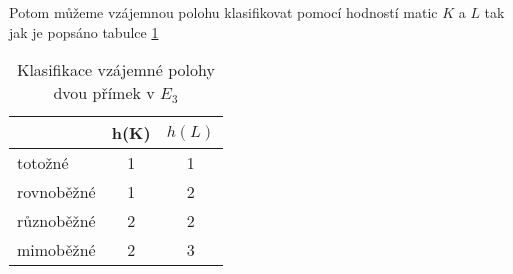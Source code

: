 Potom můžeme vzájemnou polohu klasifikovat pomocí hodností matic $K$ a $L$ tak jak je popsáno
tabulce \ref{tab:roviny_poloha}
\begin{table}[h]
    \centering
    \begin{tabular}{|l|c|c|}
    \hline
     & \multicolumn{1}{l|}{h(K)} & \multicolumn{1}{l|}{$h(L)$} \\ \hline
    totožné & 1 & 1 \\ \hline
    rovnoběžné & 1 & 2 \\ \hline
    různoběžné & 2 & 2 \\ \hline
    mimoběžné & 2 & 3 \\ \hline
    \end{tabular}
    \caption{Klasifikace vzájemné polohy dvou přímek v $E_3$}
    \label{tab:roviny_poloha}
\end{table}

